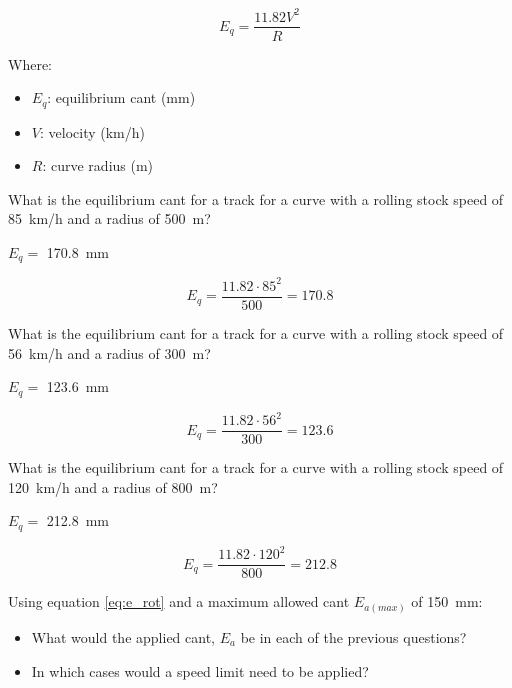 \documentclass{bcrre_exam}
\begin{document}
\begin{equation}
    \label{eq:eq_calc}
    E_q=\frac{11.82 V^2}{R}
\end{equation}

Where:
\begin{itemize}
    \item $E_q$: equilibrium cant (\unit{mm})
    \item $V$: velocity (\unit{km/h})
    \item $R$: curve radius (\unit{m})
\end{itemize}


\begin{questions}

\question
What is the equilibrium cant for a track for a curve with a rolling stock speed of \qty{85}{km/h} and a radius of \qty{500}{m}?

\begin{solution}
    $E_q=$ \qty{170.8}{mm}
    
    \begin{equation}
        E_q=\frac{11.82 \cdot 85^2}{500} = 170.8
    \end{equation}
\end{solution}

\question
What is the equilibrium cant for a track for a curve with a rolling stock speed of \qty{56}{km/h} and a radius of \qty{300}{m}?

\begin{solution}
    $E_q=$ \qty{123.6}{mm}
    
    \begin{equation}
        E_q=\frac{11.82 \cdot 56^2}{300} = 123.6
    \end{equation}
\end{solution}

\question
What is the equilibrium cant for a track for a curve with a rolling stock speed of \qty{120}{km/h} and a radius of \qty{800}{m}?

\begin{solution}
    $E_q=$ \qty{212.8}{mm}
    
    \begin{equation}
        E_q=\frac{11.82 \cdot 120^2}{800} = 212.8
    \end{equation}
\end{solution}

\question
Using equation \ref{eq:e_rot} and a maximum allowed cant $E_{a(max)}$ of \qty{150}{mm}:
\begin{itemize}
    \item What would the applied cant, $E_a$ be in each of the previous questions?
    \item In which cases would a speed limit need to be applied?
\end{itemize}


\end{questions}
\end{document}
